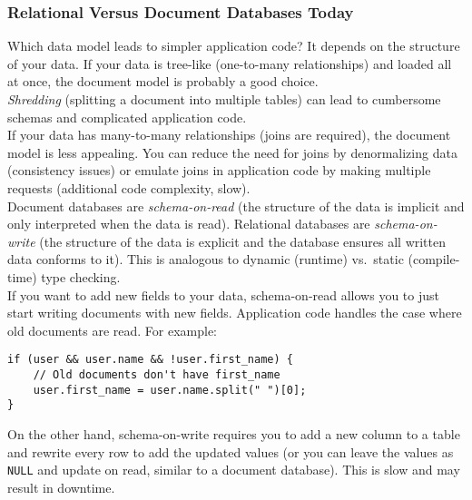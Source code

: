 \documentclass[12pt, titlepage]{article}
\begin{document}
\subsubsection{Relational Versus Document Databases Today}

Which data model leads to simpler application code? It depends on the structure of your data. If your data is tree-like (one-to-many relationships) and loaded all at once, the document model is probably a good choice. \\

\textit{Shredding} (splitting a document into multiple tables) can lead to cumbersome schemas and complicated application code. \\

If your data has many-to-many relationships (joins are required), the document model is less appealing. You can reduce the need for joins by denormalizing data (consistency issues) or emulate joins in application code by making multiple requests (additional code complexity, slow). \\

Document databases are \textit{schema-on-read} (the structure of the data is implicit and only interpreted when the data is read). Relational databases are \textit{schema-on-write} (the structure of the data is explicit and the database ensures all written data conforms to it). This is analogous to dynamic (runtime) vs.\ static (compile-time) type checking. \\

If you want to add new fields to your data, schema-on-read allows you to just start writing documents with new fields. Application code handles the case where old documents are read. For example: \\

\begin{adjustwidth}{2em}{}
\begin{verbatim}
if (user && user.name && !user.first_name) {
    // Old documents don't have first_name
    user.first_name = user.name.split(" ")[0];
}
\end{verbatim}
\end{adjustwidth} \bigskip

On the other hand, schema-on-write requires you to add a new column to a table and rewrite every row to add the updated values (or you can leave the values as \texttt{NULL} and update on read, similar to a document database). This is slow and may result in downtime. \\
\end{document}
